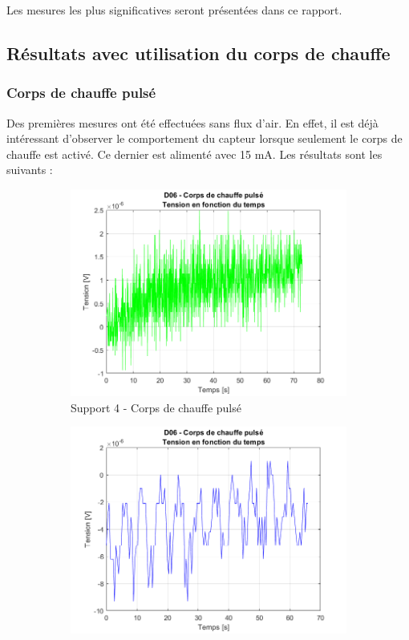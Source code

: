 Les mesures les plus significatives seront présentées dans ce rapport. \\

\subsection{Résultats avec utilisation du corps de chauffe}
\subsubsection{Corps de chauffe pulsé}
Des premières mesures ont été effectuées sans flux d'air. En effet, il est déjà intéressant d'observer le comportement du capteur
lorsque seulement le corps de chauffe est activé. Ce dernier est alimenté avec 15 mA. Les résultats sont les suivants :
\begin{figure}[H]
    \hspace{-0.5cm}
    \begin{subfigure}[b]{0.45\textwidth}
        \includegraphics[scale = 0.45]{assets/figures/D06_corps_chauffe_pulse_green.png}
        \caption{Support 4 - Corps de chauffe pulsé}
        \label{fig:chauffe_pulse_g}
    \end{subfigure}
    \begin{subfigure}[b]{0.45\textwidth}
        \includegraphics[scale = 0.45]{assets/figures/D06_corps_chauffe_pulse_blue.png}

\end{subfigure}
\end{figure}
